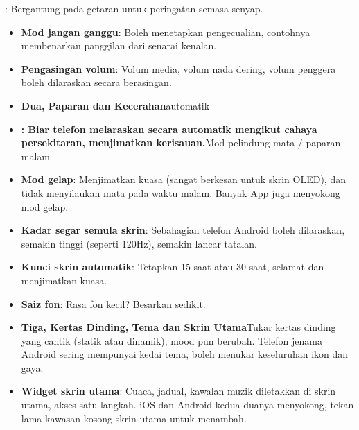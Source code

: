 


: Bergantung pada getaran untuk peringatan semasa senyap.

\begin{itemize}
  \item \textbf{Mod jangan ganggu}: Boleh menetapkan pengecualian, contohnya membenarkan panggilan dari senarai kenalan.
  \item \textbf{Pengasingan volum}: Volum media, volum nada dering, volum penggera boleh dilaraskan secara berasingan.
  \item \textbf{Dua, Paparan dan Kecerahan}automatik
  \item \textbf{: Biar telefon melaraskan secara automatik mengikut cahaya persekitaran, menjimatkan kerisauan.}Mod pelindung mata / paparan malam
\end{itemize}


\begin{itemize}
  \item \textbf{Mod gelap}: Menjimatkan kuasa (sangat berkesan untuk skrin OLED), dan tidak menyilaukan mata pada waktu malam. Banyak App juga menyokong mod gelap.
  \item \textbf{Kadar segar semula skrin}: Sebahagian telefon Android boleh dilaraskan, semakin tinggi (seperti 120Hz), semakin lancar tatalan.
  \item \textbf{Kunci skrin automatik}: Tetapkan 15 saat atau 30 saat, selamat dan menjimatkan kuasa.
  \item \textbf{Saiz fon}: Rasa fon kecil? Besarkan sedikit.
  \item \textbf{Tiga, Kertas Dinding, Tema dan Skrin Utama}Tukar kertas dinding yang cantik (statik atau dinamik), mood pun berubah. Telefon jenama Android sering mempunyai kedai tema, boleh menukar keseluruhan ikon dan gaya.
  \item \textbf{Widget skrin utama}: Cuaca, jadual, kawalan muzik diletakkan di skrin utama, akses satu langkah. iOS dan Android kedua-duanya menyokong, tekan lama kawasan kosong skrin utama untuk menambah.
\end{itemize}

